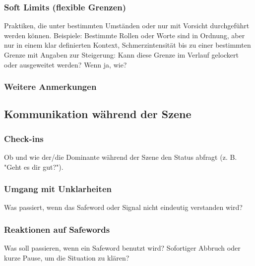 \documentclass[a4paper,12pt]{article}
\begin{document}
\subsubsection{Soft Limits (flexible Grenzen)}
\noindent Praktiken, die unter bestimmten Umständen oder nur mit Vorsicht durchgeführt werden können. Beispiele: Bestimmte Rollen oder Worte sind in Ordnung, aber nur in einem klar definierten Kontext, Schmerzintensität bis zu einer bestimmten Grenze mit Angaben zur Steigerung: Kann diese Grenze im Verlauf gelockert oder ausgeweitet werden? Wenn ja, wie?\newline
\noindent \TextField[name=LimitsSoft,multiline=true,height=15em, width=37em]{}

\subsubsection{Weitere Anmerkungen}
\noindent \TextField[name=LimitsAnmerkungen,multiline=true,height=5em, width=37em]{}

\newpage
\subsection{Kommunikation während der Szene}
\subsubsection{Check-ins}
\noindent Ob und wie der/die Dominante während der Szene den Status abfragt (z. B. "Geht es dir gut?").\newline
\noindent \TextField[name=KommCheckIn,multiline=true,height=12em, width=37em]{}

\subsubsection{Umgang mit Unklarheiten}
\noindent Was passiert, wenn das Safeword oder Signal nicht eindeutig verstanden wird?\newline
\noindent \TextField[name=KommUnklar,multiline=true,height=12em, width=37em]{}

\subsubsection{Reaktionen auf Safewords}
\noindent Was soll passieren, wenn ein Safeword benutzt wird? Sofortiger Abbruch oder kurze Pause, um die Situation zu klären? \newline
\noindent \TextField[name=KommSafeReak,multiline=true,height=12em, width=37em]{}
\end{document}
